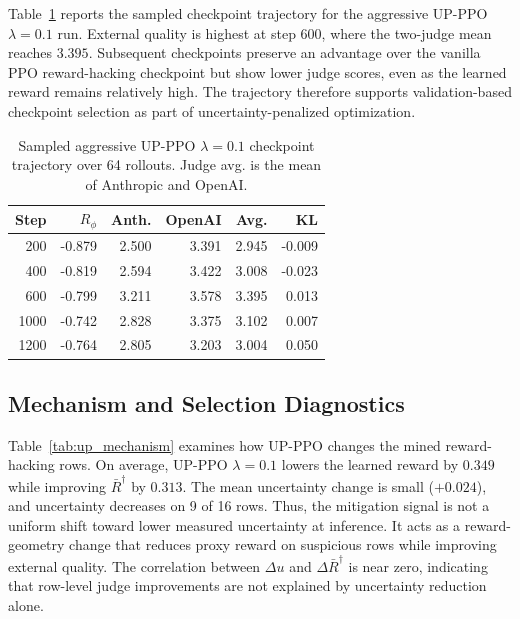 \documentclass[11pt]{article}
\newcommand{\Rphi}{R_{\phi}}
\begin{document}
Table~\ref{tab:up_lambda01_trajectory} reports the sampled checkpoint trajectory for the aggressive UP-PPO $\lambda=0.1$ run. External quality is highest at step 600, where the two-judge mean reaches $3.395$. Subsequent checkpoints preserve an advantage over the vanilla PPO reward-hacking checkpoint but show lower judge scores, even as the learned reward remains relatively high. The trajectory therefore supports validation-based checkpoint selection as part of uncertainty-penalized optimization.

\begin{table}[!tbp]
\centering
\scriptsize
\caption{Sampled aggressive UP-PPO $\lambda=0.1$ checkpoint trajectory over 64 rollouts. Judge avg. is the mean of Anthropic and OpenAI.}
\label{tab:up_lambda01_trajectory}
\begin{tabular}{rrrrrr}
\toprule
Step & $\Rphi$ & Anth. & OpenAI & Avg. & KL \\
\midrule
200 & -0.879 & 2.500 & 3.391 & 2.945 & -0.009 \\
400 & -0.819 & 2.594 & 3.422 & 3.008 & -0.023 \\
600 & -0.799 & 3.211 & 3.578 & 3.395 & 0.013 \\
1000 & -0.742 & 2.828 & 3.375 & 3.102 & 0.007 \\
1200 & -0.764 & 2.805 & 3.203 & 3.004 & 0.050 \\
\bottomrule
\end{tabular}
\end{table}



\subsection{Mechanism and Selection Diagnostics}
Table~\ref{tab:up_mechanism} examines how UP-PPO changes the mined reward-hacking rows. On average, UP-PPO $\lambda=0.1$ lowers the learned reward by $0.349$ while improving $\bar R^\dagger$ by $0.313$. The mean uncertainty change is small ($+0.024$), and uncertainty decreases on 9 of 16 rows. Thus, the mitigation signal is not a uniform shift toward lower measured uncertainty at inference. It acts as a reward-geometry change that reduces proxy reward on suspicious rows while improving external quality. The correlation between $\Delta u$ and $\Delta\bar R^\dagger$ is near zero, indicating that row-level judge improvements are not explained by uncertainty reduction alone.
\end{document}
